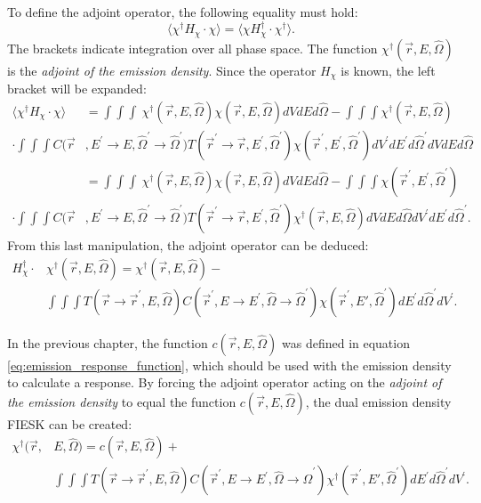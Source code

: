 To define the adjoint operator, the following equality must hold: 
\begin{equation*}
  \langle \chi^{\dagger}H_{\chi} \cdot \chi \rangle = 
  \langle \chi H_{\chi}^{\dagger} \cdot \chi^{\dagger} \rangle.
\end{equation*}
The brackets indicate integration over all phase space. The function 
$\chi^{\dagger}(\vec{r},E,\hat{\Omega})$ is the 
\textit{adjoint of the emission density}. Since the operator $H_{\chi}$ is known,
the left bracket will be expanded:
\begin{align}
  \langle \chi^{\dagger}H_{\chi} \cdot \chi \rangle & =
  \int\int\int \
  \chi^{\dagger}(\vec{r},E,\hat{\Omega}) \chi(\vec{r},E,\hat{\Omega})
  dV dE d\hat{\Omega} - \int\int\int \chi^{\dagger}(\vec{r},E,\hat{\Omega}) 
  \nonumber \\
  \cdot \int\int\int 
  C(\vec{r}&,E^{'} \to E, \hat{\Omega}^{'} \to \hat{\Omega}^{'})
  T(\vec{r}^{'} \to \vec{r},E^{'},\hat{\Omega}^{'})
  \chi(\vec{r}^{'},E^{'},\hat{\Omega}^{'}) dV^{'}dE^{'}d\hat{\Omega}^{'}
  dV dE d\hat{\Omega} \nonumber \\
  & = \int\int\int \
  \chi^{\dagger}(\vec{r},E,\hat{\Omega}) \chi(\vec{r},E,\hat{\Omega})
  dV dE d\hat{\Omega} - \int\int\int \chi(\vec{r}^{'},E^{'},\hat{\Omega}^{'}) 
  \nonumber \\
  \cdot \int\int\int 
  C(\vec{r}&,E^{'} \to E, \hat{\Omega}^{'} \to \hat{\Omega}^{'})
  T(\vec{r}^{'} \to \vec{r},E^{'},\hat{\Omega}^{'})
  \chi^{\dagger}(\vec{r},E,\hat{\Omega}) dV dE d\hat{\Omega}
  dV^{'}dE^{'}d\hat{\Omega}^{'}. \nonumber
\end{align}
From this last manipulation, the adjoint operator can be deduced: 
\begin{equation}
  \begin{split}
    H_{\chi}^{\dagger} \cdot &\chi^{\dagger}(\vec{r},E,\hat{\Omega}) = 
    \chi^{\dagger}(\vec{r},E,\hat{\Omega}) - \\
    & \int\int\int T(\vec{r} \to \vec{r}^{'},E,\hat{\Omega}) 
    C(\vec{r}^{'},E \to E^{'},\hat{\Omega} \to \hat{\Omega}^{'})
    \chi(\vec{r}^{'},E',\hat{\Omega}^{'}) dE^{'}d\hat{\Omega}^{'}dV^{'}.
  \end{split}
\end{equation}

In the previous chapter, the function $c(\vec{r},E,\hat{\Omega})$ was defined 
in equation \ref{eq:emission_response_function}, which should be used with 
the emission density to calculate a response. By forcing the adjoint 
operator acting on the \textit{adjoint of the emission density} to equal the 
function $c(\vec{r},E,\hat{\Omega})$, the dual emission density FIESK can be 
created:
\begin{equation}
  \begin{split}
    \chi^{\dagger}(\vec{r},&E,\hat{\Omega}) = c(\vec{r},E,\hat{\Omega}) + \\
    &\int\int\int T(\vec{r} \to \vec{r}^{'},E,\hat{\Omega}) 
    C(\vec{r}^{'},E \to E^{'},\hat{\Omega} \to \hat{\Omega}^{'})
    \chi^{\dagger}(\vec{r}^{'},E',\hat{\Omega}^{'}) dE^{'}d\hat{\Omega}^{'}dV^{'}.
  \end{split}
  \label{eq:adjoint_of_emission_density_integral_eqn}
\end{equation}

